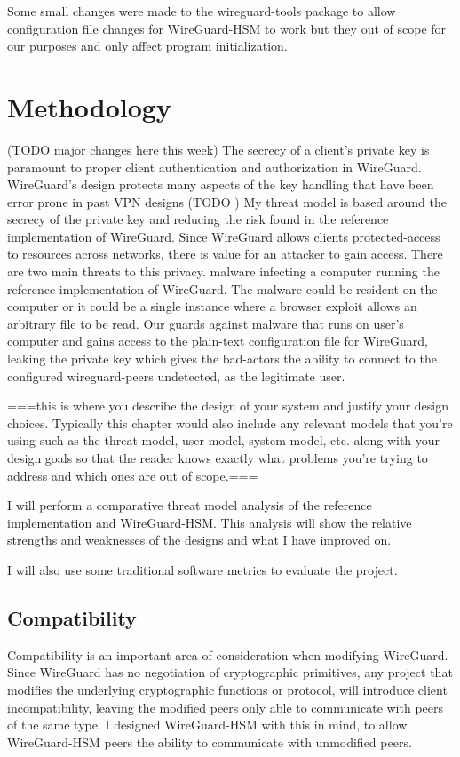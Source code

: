 \documentclass [11pt, proquest] {uwthesis}[2020/02/24]
\begin{document}
Some small changes were made to the wireguard-tools package to allow configuration file changes for WireGuard-HSM to work but they out of scope for our purposes and only affect program initialization. 

\chapter {Methodology}
(TODO major changes here this week)
The secrecy of a client's private key is paramount to proper client authentication and authorization in WireGuard. WireGuard's design protects many aspects of the key handling that have been error prone in past VPN designs (TODO )
My threat model is based around the secrecy of the private key and reducing the risk found in the reference implementation of WireGuard. Since WireGuard allows clients protected-access to resources across networks, there is value for an attacker to gain access. 
There are two main threats to this privacy.  malware infecting a computer running the reference implementation of WireGuard. The malware could be resident on the computer or it could be a single instance where a browser exploit allows an arbitrary file to be read. Our guards against malware that runs on user's computer and gains access to the plain-text configuration file for WireGuard, leaking the private key which gives the bad-actors the ability to connect to the configured wireguard-peers undetected, as the legitimate user.


===this is where you describe the design of your system and justify your design choices.  Typically this chapter would also include any relevant models that you're using such as the threat model, user model, system model, etc. along with your design goals so that the reader knows exactly what problems you're trying to address and which ones are out of scope.===

I will perform a comparative threat model analysis of the reference implementation and WireGuard-HSM. This analysis will show the relative strengths and weaknesses of the designs and what I have improved on.

I will also use some traditional software metrics to evaluate the project.


\section{Compatibility}
Compatibility is an important area of consideration when modifying WireGuard. Since WireGuard has no negotiation of cryptographic primitives, any project that modifies the underlying cryptographic functions or protocol, will introduce client incompatibility, leaving the modified peers only able to communicate with peers of the same type. I designed WireGuard-HSM with this in mind, to allow WireGuard-HSM peers the ability to communicate with unmodified peers.
\end{document}
